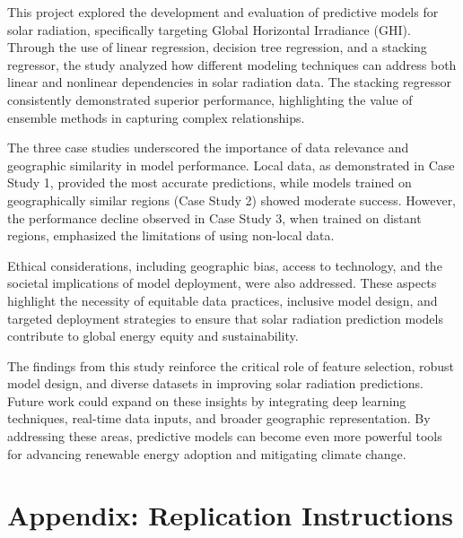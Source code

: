 \documentclass[10pt,twocolumn]{article}
\begin{document}
This project explored the development and evaluation of predictive models for solar radiation, specifically targeting Global Horizontal Irradiance (GHI). Through the use of linear regression, decision tree regression, and a stacking regressor, the study analyzed how different modeling techniques can address both linear and nonlinear dependencies in solar radiation data. The stacking regressor consistently demonstrated superior performance, highlighting the value of ensemble methods in capturing complex relationships.

The three case studies underscored the importance of data relevance and geographic similarity in model performance. Local data, as demonstrated in Case Study 1, provided the most accurate predictions, while models trained on geographically similar regions (Case Study 2) showed moderate success. However, the performance decline observed in Case Study 3, when trained on distant regions, emphasized the limitations of using non-local data.

Ethical considerations, including geographic bias, access to technology, and the societal implications of model deployment, were also addressed. These aspects highlight the necessity of equitable data practices, inclusive model design, and targeted deployment strategies to ensure that solar radiation prediction models contribute to global energy equity and sustainability.

The findings from this study reinforce the critical role of feature selection, robust model design, and diverse datasets in improving solar radiation predictions. Future work could expand on these insights by integrating deep learning techniques, real-time data inputs, and broader geographic representation. By addressing these areas, predictive models can become even more powerful tools for advancing renewable energy adoption and mitigating climate change.
\pagebreak
\newpage
\appendix

\newpage\section*{Appendix: Replication Instructions}
\end{document}
